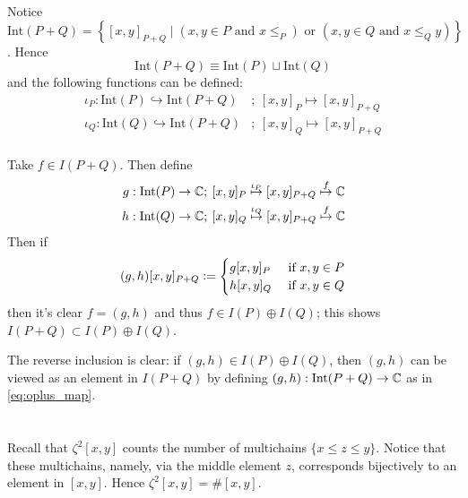 \documentclass[12pt]{article}
\begin{document}
\section{}


\section{}
Notice $\text{Int}(P + Q) = \left\{ [x, y]_{P + Q} \mid (x, y \in P \text{ and } x \leq_{P}) \text{ or } (x, y \in Q \text{ and } x \leq_{Q} y) \right\}$. 
Hence 
$$\text{Int}(P + Q) \equiv \text{Int}(P) \sqcup \text{Int}(Q)$$
and the following functions can be defined: 
\begin{align*}
  \iota_{P}: \text{Int}(P) \hookrightarrow \text{Int}(P + Q) & ; \: [x, y]_{P} \mapsto [x, y]_{P + Q} \\ 
  \iota_{Q}: \text{Int}(Q) \hookrightarrow \text{Int}(P + Q) & ; \: [x, y]_{Q} \mapsto [x, y]_{P + Q} \\ 
\end{align*}

Take $f \in I(P + Q)$. 
Then define 
\begin{align*}
  g: \text{Int}(P) \rightarrow \mathbb{C} & ; \: [x, y]_{P} \overset{\iota_{P}}{\mapsto} [x, y]_{P + Q} \overset{f}{\mapsto} \mathbb{C} \\ 
  h: \text{Int}(Q) \rightarrow \mathbb{C} & ; \: [x, y]_{Q} \overset{\iota_{Q}}{\mapsto} [x, y]_{P + Q} \overset{f}{\mapsto} \mathbb{C}
\end{align*} 
Then if 
\begin{equation} \label{eq:oplus_map}
  (g, h)[x, y]_{P + Q} \vcentcolon= 
  \begin{cases}
    g[x, y]_{P} & \text{ if } x, y \in P \\ 
    h[x, y]_{Q} & \text{ if } x, y \in Q
  \end{cases}
\end{equation}
then it's clear $f = (g, h)$ and thus $f \in I(P) \oplus I(Q)$; 
this shows $I(P + Q) \subset I(P) \oplus I(Q)$. 

The reverse inclusion is clear: 
if $(g, h) \in I(P) \oplus I(Q)$, then $(g, h)$ can be viewed as an element in $I(P + Q)$ by defining $(g, h): \text{Int}(P + Q) \rightarrow \mathbb{C}$ as in \eqref{eq:oplus_map}. 

\section{}
Recall that $\zeta^2[x, y]$ counts the number of multichains $\{x \leq z \leq y\}$. 
Notice that these multichains, namely, via the middle element $z$, corresponds bijectively to an element in $[x, y]$. 
Hence $\zeta^2[x, y] = \#[x, y]$. 
\end{document}
